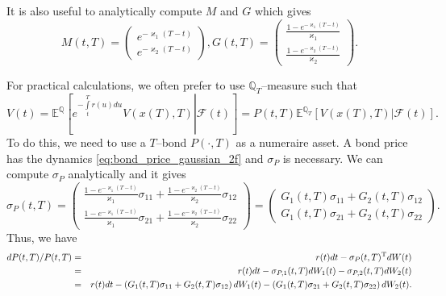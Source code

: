 \documentclass[11pt,a4paper]{article}
\numberwithin{equation}{section}
\begin{document}
It is also useful to analytically compute $M$ and $G$ which gives
\begin{equation*}
  M(t,T) = \left( {\begin{array}{*{20}{c}}
{{e^{ - {\varkappa _1}(T - t)}}}\\
{{e^{ - {\varkappa _2}(T - t)}}}
\end{array}} \right),G(t,T) = \left( {\begin{array}{*{20}{c}}
{\frac{{1 - {e^{ - {\varkappa _1}(T - t)}}}}{{{\varkappa _1}}}}\\
{\frac{{1 - {e^{ - {\varkappa _2}(T - t)}}}}{{{\varkappa _2}}}}
\end{array}} \right).
\end{equation*}

For practical calculations, we often prefer to use $\mathbb{Q}_T$--measure such that
\begin{equation*}
  V(t) = {\mathbb{E}^\mathbb{Q}}\left[ {\left. {{e^{ - \int\limits_t^T {r(u)du} }}V(x(T),T)} \right|{\mathcal F}(t)} \right] = P(t,T){\mathbb{E}^{{\mathbb{Q}_T}}}\left[ {\left. {V(x(T),T)} \right|{\mathcal F}(t)} \right].
\end{equation*}
To do this, we need to use a $T$--bond $P(\cdot, T)$ as a numeraire asset. A bond price has the dynamics \eqref{eq:bond_price_gaussian_2f} and $\sigma_P$ is necessary. We can compute $\sigma_P$ analytically and it gives
\begin{equation*}
  {\sigma _P}(t,T) = \left( {\begin{array}{*{20}{c}}
{\frac{{1 - {e^{ - {\varkappa_1}(T - t)}}}}{{{\varkappa_1}}}{\sigma _{11}} + \frac{{1 - {e^{ - {\varkappa_2}(T - t)}}}}{{{\varkappa_2}}}{\sigma _{12}}}\\
{\frac{{1 - {e^{ - {\varkappa_1}(T - t)}}}}{{{\varkappa_1}}}{\sigma _{21}} + \frac{{1 - {e^{ - {\varkappa_2}(T - t)}}}}{{{\varkappa_2}}}{\sigma _{22}}}
\end{array}} \right) = \left( {\begin{array}{*{20}{c}}
{{G_1}(t,T){\sigma _{11}} + {G_2}(t,T){\sigma _{12}}}\\
{{G_1}(t,T){\sigma _{21}} + {G_2}(t,T){\sigma _{22}}}
\end{array}} \right).
\end{equation*}
Thus, we have
\begin{eqnarray*}
dP(t,T)/P(t,T) &=& r(t)dt - {\sigma _P}{(t,T)^{\rm{T}}}dW(t)\\
 &=& r(t)dt - {\sigma _{P,1}}(t,T)d{W_1}(t) - {\sigma _{P,2}}(t,T)d{W_2}(t)\\
 &=& r(t)dt - \left( {{G_1}(t,T){\sigma _{11}} + {G_2}(t,T){\sigma _{12}}} \right)d{W_1}(t) - \left( {{G_1}(t,T){\sigma _{21}} + {G_2}(t,T){\sigma _{22}}} \right)d{W_2}(t).
\end{eqnarray*}
\end{document}
